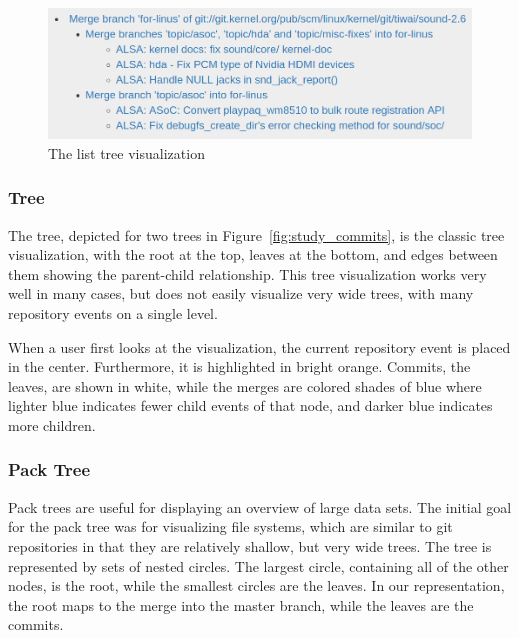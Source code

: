 \begin{figure}
        \centering
        \includegraphics[width=0.9\figwidth]{figures/linvis/linvis_list_tree.png}
        \caption{The list tree visualization}
        \label{fig:linvis_list_tree}
\end{figure}

\subsubsection{\rt Tree}

The \rt tree\cite{Reingold1981}, depicted for two trees in
Figure~\ref{fig:study_commits}, is the classic tree visualization, with
the root at the top, leaves at the bottom, and edges between them
showing the parent-child relationship. This tree visualization works
very well in many cases, but does not easily visualize very wide trees,
with many repository events on a single level.

When a user first looks at the visualization, the current repository
event is placed in the center. Furthermore, it is highlighted in bright
orange. Commits, the leaves, are shown in white, while the merges are
colored shades of blue where lighter blue indicates fewer child events
of that node, and darker blue indicates more children.

\subsubsection{Pack Tree}

Pack trees\cite{Wang2006} are useful for displaying an overview of large
data sets. The initial goal for the pack tree was for visualizing file
systems, which are similar to git repositories in that they are
relatively shallow, but very wide trees. The tree is represented by sets
of nested circles. The largest circle, containing all of the other
nodes, is the root, while the smallest circles are the leaves. In our
representation, the root maps to the merge into the master branch, while
the leaves are the commits.


